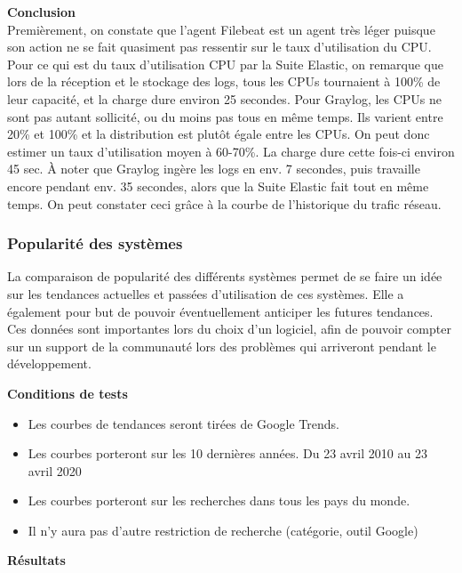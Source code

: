 \documentclass[paper=a4, fontsize=11pt]{scrartcl}
\begin{document}
\textbf{Conclusion} \\
Premièrement, on constate que l'agent Filebeat est un agent très léger puisque son action ne se fait quasiment pas ressentir sur le taux d'utilisation du CPU. Pour ce qui est du taux d'utilisation CPU par la Suite Elastic, on remarque que lors de la réception et le stockage des logs, tous les CPUs tournaient à 100\% de leur capacité, et la charge dure environ 25 secondes. Pour Graylog, les CPUs ne sont pas autant sollicité, ou du moins pas tous en même temps. Ils varient entre 20\% et 100\% et la distribution est plutôt égale entre les CPUs. On peut donc estimer un taux d'utilisation moyen à 60-70\%. La charge dure cette fois-ci environ 45 sec. À noter que Graylog ingère les logs en env. 7 secondes, puis travaille encore pendant env. 35 secondes, alors que la Suite Elastic fait tout en même temps. On peut constater ceci grâce à la courbe de l'historique du trafic réseau.

\subsubsection{Popularité des systèmes}

La comparaison de popularité des différents systèmes permet de se faire un idée sur les tendances actuelles et passées d'utilisation de ces systèmes. Elle a également pour but de pouvoir éventuellement anticiper les futures tendances. Ces données sont importantes lors du choix d'un logiciel, afin de pouvoir compter sur un support de la communauté lors des problèmes qui arriveront pendant le développement.

\textbf{Conditions de tests} \\

\begin{itemize}
    \item Les courbes de tendances seront tirées de Google Trends.
    \item Les courbes porteront sur les 10 dernières années.
    \subitem Du 23 avril 2010 au 23 avril 2020
    \item Les courbes porteront sur les recherches dans tous les pays du monde.
    \item Il n'y aura pas d'autre restriction de recherche (catégorie, outil Google)
\end{itemize}

\textbf{Résultats} \\
\end{document}
